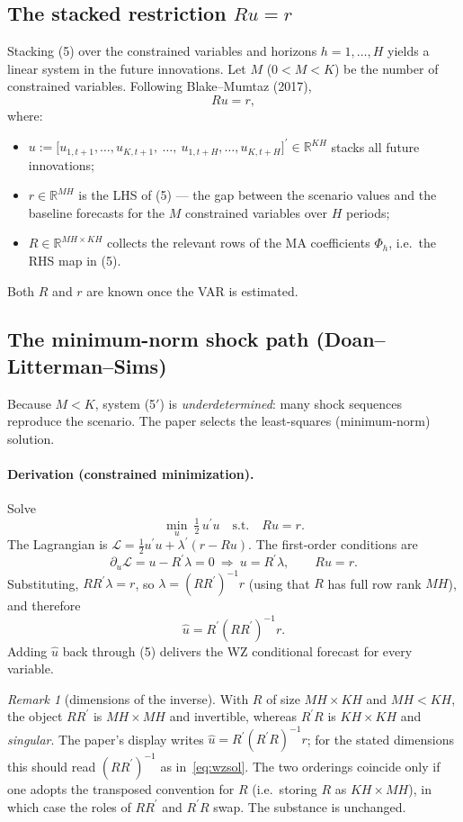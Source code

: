 \documentclass[11pt]{article}
\newcommand{\R}{\mathbb{R}}
\newcommand{\tp}{^{\prime}}
\theoremstyle{remark}
\newtheorem{remark}{Remark}
\begin{document}
\subsection*{The stacked restriction $Ru=r$}
Stacking (5) over the constrained variables and horizons $h=1,\dots,H$ yields a
linear system in the future innovations. Let $M$ ($0<M<K$) be the number of
constrained variables. Following Blake--Mumtaz (2017),
\begin{equation}
Ru=r,\tag{5$'$}
\end{equation}
where:
\begin{itemize}[nosep]
\item $u:=\big[u_{1,t+1},\dots,u_{K,t+1},\ \dots,\ u_{1,t+H},\dots,u_{K,t+H}\big]\tp
\in\R^{KH}$ stacks all future innovations;
\item $r\in\R^{MH}$ is the LHS of (5) — the gap between the scenario values and
the baseline forecasts for the $M$ constrained variables over $H$ periods;
\item $R\in\R^{MH\times KH}$ collects the relevant rows of the MA coefficients
$\Phi_h$, i.e.\ the RHS map in (5).
\end{itemize}
Both $R$ and $r$ are known once the VAR is estimated.

\subsection*{The minimum-norm shock path (Doan--Litterman--Sims)}
Because $M<K$, system (5$'$) is \emph{underdetermined}: many shock sequences
reproduce the scenario. The paper selects the least-squares (minimum-norm)
solution.

\paragraph{Derivation (constrained minimization).} Solve
\[
\min_{u}\ \tfrac12\,u\tp u \quad\text{s.t.}\quad Ru=r.
\]
The Lagrangian is $\mathcal L=\tfrac12 u\tp u+\lambda\tp(r-Ru)$. The first-order
conditions are
\[
\partial_u\mathcal L=u-R\tp\lambda=0 \ \Rightarrow\ u=R\tp\lambda,
\qquad Ru=r.
\]
Substituting, $RR\tp\lambda=r$, so $\lambda=(RR\tp)^{-1}r$ (using that $R$ has
full row rank $MH$), and therefore
\begin{equation}
\hat u = R\tp(RR\tp)^{-1}r. \tag{5$''$}\label{eq:wzsol}
\end{equation}
Adding $\hat u$ back through (5) delivers the WZ conditional forecast for every
variable. 

\begin{remark}[dimensions of the inverse]
With $R$ of size $MH\times KH$ and $MH<KH$, the object $RR\tp$ is
$MH\times MH$ and invertible, whereas $R\tp R$ is $KH\times KH$ and
\emph{singular}. The paper's display writes $\hat u=R\tp(R\tp R)^{-1}r$; for the
stated dimensions this should read $(RR\tp)^{-1}$ as in~\eqref{eq:wzsol}. The two
orderings coincide only if one adopts the transposed convention for $R$ (i.e.\
storing $R$ as $KH\times MH$), in which case the roles of $RR\tp$ and $R\tp R$
swap. The substance is unchanged.
\end{remark}
\end{document}
